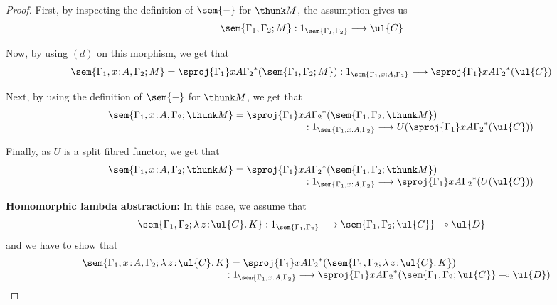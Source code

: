\begin{proof}
First, by inspecting the definition of $\sem{-}$ for $\thunk M$, the assumption gives us
\[
\sem{\Gamma_1,\Gamma_2;M} : 1_{\sem{\Gamma_1,\Gamma_2}} \longrightarrow \ul{C}
\]

Now, by using $(d)$ on this morphism, we get that
\[
\sem{\Gamma_1, x \!:\! A,\Gamma_2;M} = \sproj {\Gamma_1} x A {\Gamma_2}^*(\sem{\Gamma_1,\Gamma_2;M}) : 1_{\sem{\Gamma_1, x : A,\Gamma_2}} \longrightarrow \sproj {\Gamma_1} x A {\Gamma_2}^*(\ul{C})
\]

Next, by using the definition of $\sem{-}$ for $\thunk M$, we get that
\[
\begin{array}{c}
\hspace{-2.75cm}
\sem{\Gamma_1, x \!:\! A,\Gamma_2;\thunk M} = \sproj {\Gamma_1} x A {\Gamma_2}^*(\sem{\Gamma_1,\Gamma_2;\thunk M}) 
\\
\hspace{7.7cm}
: 1_{\sem{\Gamma_1, x : A,\Gamma_2}} \longrightarrow U(\sproj {\Gamma_1} x A {\Gamma_2}^*(\ul{C}))
\end{array}
\]

Finally, as $U$ is a split fibred functor, we get that
\[
\begin{array}{c}
\hspace{-2.75cm}
\sem{\Gamma_1, x \!:\! A,\Gamma_2;\thunk M} = \sproj {\Gamma_1} x A {\Gamma_2}^*(\sem{\Gamma_1,\Gamma_2;\thunk M}) 
\\
\hspace{7.7cm}
: 1_{\sem{\Gamma_1, x : A,\Gamma_2}} \longrightarrow \sproj {\Gamma_1} x A {\Gamma_2}^*(U(\ul{C}))
\end{array}
\]

\vspace{0.2cm}
\noindent
\textbf{Homomorphic lambda abstraction:}
In this case, we assume that
\[
\sem{\Gamma_1,\Gamma_2;\lambda\, z \!:\! \ul{C} .\, K} : 1_{\sem{\Gamma_1,\Gamma_2}} \longrightarrow \sem{\Gamma_1,\Gamma_2;\ul{C}} \multimap \ul{D}
\]
and we have to show that
\[
\begin{array}{c}
\hspace{-3cm}
\sem{\Gamma_1, x \!:\! A,\Gamma_2;\lambda\, z \!:\! \ul{C} .\, K} = \sproj {\Gamma_1} x A {\Gamma_2}^*(\sem{\Gamma_1,\Gamma_2;\lambda\, z \!:\! \ul{C} .\, K}) 
\\
\hspace{5.5cm}
: 1_{\sem{\Gamma_1, x : A,\Gamma_2}} \longrightarrow \sproj {\Gamma_1} x A {\Gamma_2}^*(\sem{\Gamma_1,\Gamma_2;\ul{C}} \multimap \ul{D})
\end{array}
\]


\end{proof}
